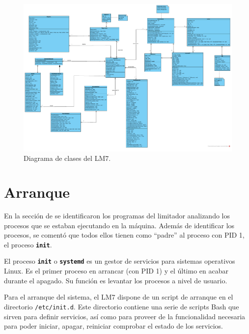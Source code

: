 \begin{figure}[h]
    \centering
    \includegraphics[scale=0.75, angle=90]{figuras/lms7-class-diagram.pdf}
    \caption{Diagrama de clases del \acrshort{LM7}.}
    \label{fig:lm7-class-diagram}
\end{figure}

\clearpage
\section{Arranque} \label{sec:lms7-init}

En la sección de  se identificaron los programas del limitador analizando los procesos que se estaban ejecutando en la máquina. Además de identificar los procesos, se comentó que todos ellos tienen como ``padre'' al proceso con \acrshort{PID} 1, el proceso \textbf{\texttt{init}}.

\begin{shaded}
    \noindent
    El proceso \textbf{\texttt{init}} o \textbf{\texttt{systemd}} es un gestor de servicios para sistemas operativos Linux. Es el primer proceso en arrancar (con \acrshort{PID} 1) y el último en acabar durante el apagado. Su función es levantar los procesos a nivel de usuario.
\end{shaded}

Para el arranque del sistema, el \acrshort{LM7} dispone de un script de arranque en el directorio \verb|/etc/init.d|. Este directorio contiene una serie de scripts Bash que sirven para definir servicios, así como para proveer de la funcionalidad necesaria para poder iniciar, apagar, reiniciar comprobar el estado de los servicios.

